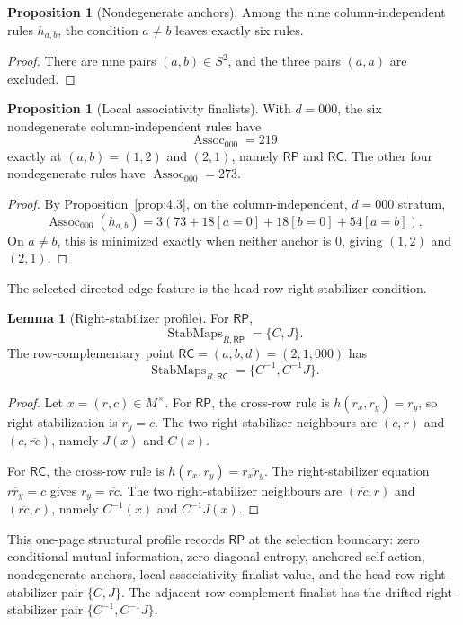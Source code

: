 \documentclass[11pt]{article}
\theoremstyle{definition}
\newtheorem{lemma}[theorem]{Lemma}
\newtheorem{proposition}[theorem]{Proposition}
\newcommand{\RP}{\mathsf{RP}}
\newcommand{\RC}{\mathsf{RC}}
\begin{document}
\begin{proposition}[Nondegenerate anchors]
\label{prop:10.1}
Among the nine column-independent rules \(h_{a,b}\), the condition \(a\ne b\) leaves
exactly six rules.
\end{proposition}

\begin{proof}
There are nine pairs \((a,b)\in S^2\), and the three pairs \((a,a)\) are
excluded.
\end{proof}

\begin{proposition}[Local associativity finalists]
\label{prop:10.3}
With \(d=000\), the six nondegenerate column-independent rules have
\[
\operatorname{Assoc}_{000}=219
\]
exactly at \((a,b)=(1,2)\) and \((2,1)\), namely \(\RP\) and \(\RC\).  The
other four nondegenerate rules have \(\operatorname{Assoc}_{000}=273\).
\end{proposition}

\begin{proof}
By Proposition~\ref{prop:4.3}, on the column-independent, \(d=000\) stratum,
\[
\operatorname{Assoc}_{000}(h_{a,b})
=
3\left(73+18[a=0]+18[b=0]+54[a=b]\right).
\]
On \(a\ne b\), this is minimized exactly when neither anchor is \(0\), giving
\((1,2)\) and \((2,1)\).
\end{proof}

The selected directed-edge feature is the head-row right-stabilizer condition.

\begin{lemma}[Right-stabilizer profile]
\label{lem:12.1}
For \(\RP\),
\[
\operatorname{StabMaps}_{R,\RP}=\{C,J\}.
\]
The row-complementary point \(\RC=(a,b,d)=(2,1,000)\) has
\[
\operatorname{StabMaps}_{R,\RC}=\{C^{-1},C^{-1}J\}.
\]
\end{lemma}

\begin{proof}
Let \(x=(r,c)\in M^\times\).  For \(\RP\), the cross-row rule is
\(h(r_x,r_y)=r_y\), so right-stabilization is \(r_y=c\).  The two right-stabilizer neighbours
are \((c,r)\) and \((c,\overline{rc})\), namely \(J(x)\) and \(C(x)\).

For \(\RC\), the cross-row rule is \(h(r_x,r_y)=\overline{r_xr_y}\).  The
right-stabilizer equation \(\overline{rr_y}=c\) gives \(r_y=\overline{rc}\).  The two
right-stabilizer neighbours are \((\overline{rc},r)\) and \((\overline{rc},c)\), namely
\(C^{-1}(x)\) and \(C^{-1}J(x)\).
\end{proof}

This one-page structural profile records \(\RP\) at the selection boundary: zero conditional mutual information, zero diagonal entropy, anchored self-action, nondegenerate anchors,
local associativity finalist value, and the head-row right-stabilizer pair
\(\{C,J\}\).  The adjacent row-complement finalist has the drifted right-stabilizer
pair \(\{C^{-1},C^{-1}J\}\).
\end{document}
